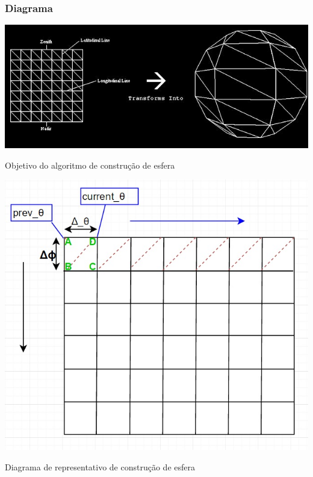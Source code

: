 \newpage
\subsubsection{Diagrama}


\begin{center}
 	
 	\includegraphics[width=\textwidth,height=\textheight,keepaspectratio]{resources/sphere05.jpg}
 	\captionsetup{type=figure, width=0.8\linewidth}
	\caption{Objetivo do algoritmo de construção de esfera}
\label{fig:ssec1:diagram:plane:to:sphere} 
\end{center}



\begin{center}
 	
 	\includegraphics[keepaspectratio]{resources/esferaw.jpg}
 	\captionsetup{type=figure, width=0.8\linewidth}
	\caption{Diagrama de representativo de construção de esfera}
\label{fig:ssec1:diagram:sphere} 
\end{center}


